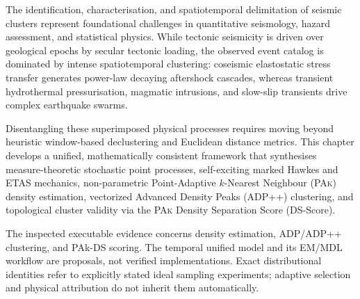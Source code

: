 
\providecommand{\bm}[1]{\mathbf{#1}}
\providecommand{\coloneqq}{\mathrel{\mathop:}=}
\providecommand{\mathds}[1]{\mathbb{#1}}
\providecommand{\pak}{\textsc{PAk}}
\providecommand{\kstar}{k^{*}}
\providecommand{\xvec}{\bm{x}}
\providecommand{\mdl}{\mathrm{MDL}}
\providecommand{\Zscore}{Z}
\providecommand{\etas}{\textsc{etas}}
\providecommand{\Var}{\operatorname{Var}}
\providecommand{\Cov}{\operatorname{Cov}}

\label{chap:clustering}

The identification, characterisation, and spatiotemporal
delimitation of seismic
clusters represent foundational challenges in quantitative seismology, hazard
assessment, and statistical physics. While tectonic seismicity is driven over
geological epochs by secular tectonic loading, the observed event catalog is
dominated by intense spatiotemporal clustering: coseismic elastostatic stress
transfer generates power-law decaying aftershock cascades, whereas transient
hydrothermal pressurisation, magmatic intrusions, and slow-slip
transients drive
complex earthquake swarms.

Disentangling these superimposed physical processes requires moving beyond
heuristic window-based declustering and Euclidean distance metrics.
This chapter
develops a unified, mathematically consistent framework that synthesises
measure-theoretic stochastic point processes, self-exciting marked Hawkes and
\ac{ETAS} mechanics, non-parametric
Point-Adaptive $k$-Nearest Neighbour (\pak{}) density estimation, vectorized
Advanced Density Peaks (\textsc{ADP++}) clustering, and topological cluster
validity via the \pak{} Density Separation Score (DS-Score).

The inspected executable evidence concerns density estimation, ADP/ADP++
clustering, and PAk-DS scoring. The temporal unified model and its EM/MDL
workflow are proposals, not verified implementations. Exact distributional
identities refer to explicitly stated ideal sampling experiments; adaptive
selection and physical attribution do not inherit them automatically.

